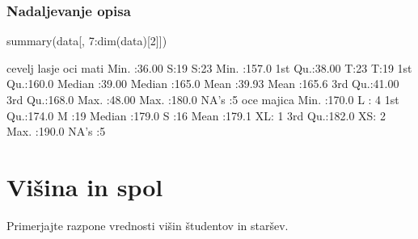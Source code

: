 \begin{frame}[fragile]
\frametitle{Nadaljevanje opisa}
\begin{Schunk}
\begin{Sinput}
  summary(data[, 7:dim(data)[2]])
\end{Sinput}
\begin{Soutput}
     cevelj      lasje  oci         mati      
 Min.   :36.00   S:19   S:23   Min.   :157.0  
 1st Qu.:38.00   T:23   T:19   1st Qu.:160.0  
 Median :39.00                 Median :165.0  
 Mean   :39.93                 Mean   :165.6  
 3rd Qu.:41.00                 3rd Qu.:168.0  
 Max.   :48.00                 Max.   :180.0  
                               NA's   :5      
      oce        majica 
 Min.   :170.0   L : 4  
 1st Qu.:174.0   M :19  
 Median :179.0   S :16  
 Mean   :179.1   XL: 1  
 3rd Qu.:182.0   XS: 2  
 Max.   :190.0          
 NA's   :5              
\end{Soutput}
\end{Schunk}
\end{frame}
\clearpage
\section{Višina in spol}

Primerjajte razpone vrednosti višin študentov in staršev.

